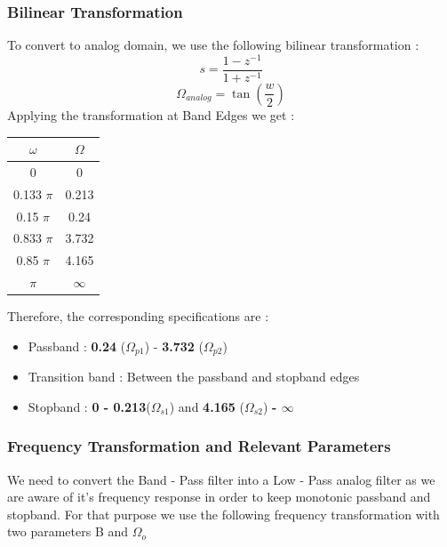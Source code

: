 \documentclass{article}
\begin{document}
\subsubsection{Bilinear Transformation}
To convert to analog domain, we use the following bilinear transformation :
\begin{equation*}
    s = \frac{1 - z^{-1}}{1 + z^{-1}}
\end{equation*}
\begin{equation*}
    \Omega_{analog} = \tan (\frac{w}{2})
\end{equation*}
Applying the transformation at Band Edges we get :
\begin{table}[H]
		\begin{center}
		\begin{tabular}{|c|c|}
			\hline
			$\omega$ & $\Omega$\\
			
			\hline
                0 & 0\\
                \hline
                0.133 $\pi$ & 0.213 \\
                \hline
                0.15 $\pi$ & 0.24\\
                \hline
                0.833 $\pi$ & 3.732\\
                \hline
                0.85 $\pi$ & 4.165\\
                \hline
                $\pi$ & $\infty$\\
                \hline
            
		\end{tabular}
		\end{center}
\end{table}

Therefore, the corresponding specifications are :
\begin{itemize}
    \item Passband :  \textbf{0.24} ($\Omega_{p1}$) - \textbf{3.732} ($\Omega_{p2}$)
    \item  Transition band : Between the passband and stopband edges
    \item Stopband : \textbf{0 - 0.213}($\Omega_{s1}$) and \textbf{4.165} ($\Omega_{s2}$) \textbf{- $\infty$}
\end{itemize}

\subsubsection{Frequency Transformation and Relevant Parameters}
We need to convert the Band - Pass filter into a Low - Pass analog filter as we are aware of it's frequency response in order to keep monotonic passband and stopband. For that purpose we use the following frequency transformation with two parameters B and $\Omega_o$
\end{document}
